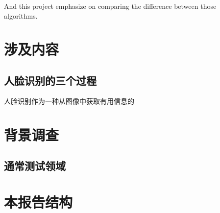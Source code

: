 And this project emphasize on comparing the difference between those algorithms.  
 

\section{涉及内容}
\subsection{人脸识别的三个过程}
人脸识别作为一种从图像中获取有用信息的
\section{背景调查}
\subsection{通常测试领域}

\section{本报告结构}
